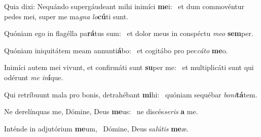 \item Quia dixi: Nequándo supergáudeant mihi inimíci \textbf{me}i:~\psstar{} et dum commovéntur pedes mei, super me ma\textit{gna} \textit{lo}\textbf{cú}ti sunt.
\item Quóniam ego in flagélla pa\textbf{rá}tus sum:~\psstar{} et dolor meus in conspéctu \textit{meo} \textbf{sem}per.
\item Quóniam iniquitátem meam annunti\textbf{á}bo:~\psstar{} et cogitábo pro pec\textit{cáto} \textbf{me}o.
\item Inimíci autem mei vivunt, et confirmáti sunt \textbf{su}per me:~\psstar{} et multiplicáti sunt qui odérunt \textit{me} \textit{in}\textbf{í}que.
\item Qui retríbuunt mala pro bonis, detrahébant \textbf{mi}hi:~\psstar{} quóniam sequébar \textit{boni}\textbf{tá}tem.
\item Ne derelínquas me, Dómine, Deus \textbf{me}us:~\psstar{} ne discés\textit{seris} \textbf{a} me.
\item Inténde in adjutórium \textbf{me}um,~\psstar{} Dómine, Deus sa\textit{lútis} \textbf{me}æ.
